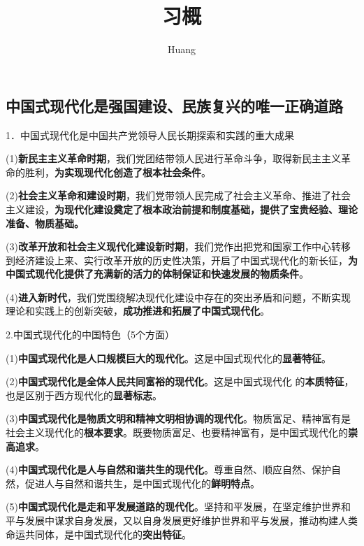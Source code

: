 \documentclass[lang=cn,10pt]{elegantbook}
\title{习概}
\author{ Huang}
\begin{document}
	
	\maketitle
	\frontmatter
	
	\tableofcontents
	
	\mainmatter
	\chapter{{\color{red} }}
	\section{中国式现代化是强国建设、民族复兴的唯一正确道路}
	
	1．中国式现代化是中国共产党领导人民长期探索和实践的重大成果
	
	(1)\textbf{新民主主义革命时期}，我们党团结带领人民进行革命斗争，取得新民主主义革命的胜利，\textbf{为实现现代化创造了根本社会条件}。
	
	(2)\textbf{社会主义革命和建设时期}，我们党带领人民完成了社会主义革命、推进了社会主义建设，\textbf{为现代化建设奠定了根本政治前提和制度基础，提供了宝贵经验、理论准备、物质基础。}
	
	(3)\textbf{改革开放和社会主义现代化建设新时期}，我们党作出把党和国家工作中心转移到经济建设上来、实行改革开放的历史性决策，开启了中国式现代化的新长征，\textbf{为中国式现代化提供了充满新的活力的体制保证和快速发展的物质条件}。
	
	(4)\textbf{进入新时代}，我们党围绕解决现代化建设中存在的突出矛盾和问题，不断实现理论和实践上的创新突破，\textbf{成功推进和拓展了中国式现代化}。
	
	2.中国式现代化的中国特色（5个方面）
	
	(1)\textbf{中国式现代化是人口规模巨大的现代化}。这是中国式现代化的\textbf{显著特征}。
	
	(2)\textbf{中国式现代化是全体人民共同富裕的现代化}。这是中国式现代化
	的\textbf{本质特征}，也是区别于西方现代化的\textbf{显著标志}。
	
	(3)\textbf{中国式现代化是物质文明和精神文明相协调的现代化}。物质富足、精神富有是社会主义现代化的\textbf{根本要求}。既要物质富足、也要精神富有，是中国式现代化的\textbf{崇高追求}。
	
	(4)\textbf{中国式现代化是人与自然和谐共生的现代化}。尊重自然、顺应自然、保护自然，促进人与自然和谐共生，是中国式现代化的\textbf{鲜明特点}。
	
	(5)\textbf{中国式现代化是走和平发展道路的现代化}。坚持和平发展，在坚定维护世界和平与发展中谋求自身发展，又以自身发展更好维护世界和平与发展，推动构建人类命运共同体，是中国式现代化的\textbf{突出特征}。
	
\end{document}
